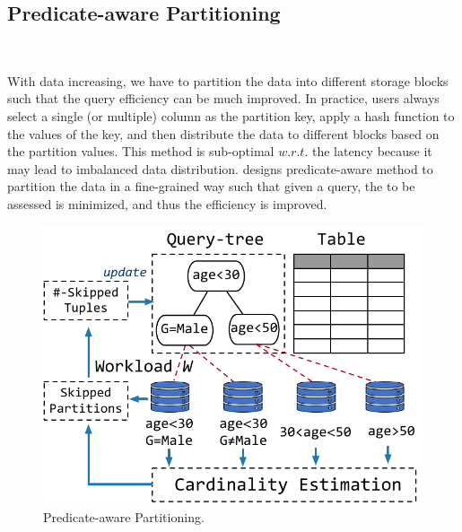 






\subsection{Predicate-aware Partitioning}~\label{subsec:partition}


With  data  increasing, we  have to partition the data into different storage blocks such that the query efficiency can be much improved. In practice, users always select a single (or multiple) column as the partition key,  apply   a hash function to the values of the key, and then distribute the data to different blocks based on the partition values. This method is sub-optimal $w.r.t.$ the latency because it may lead to imbalanced data distribution. \brain  designs predicate-aware  method to partition the data in a fine-grained way such that given a query, the  to be assessed is minimized, and thus the efficiency is improved.


\begin{figure}[htbp]
	\includegraphics[scale=0.45]{figures/partition}
	\centering
	\vspace{-1em}
	\caption{Predicate-aware Partitioning.}
	\label{fig:partition}
	\vspace{-1em}
\end{figure}


